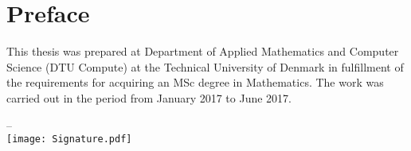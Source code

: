 \chapter{Preface}
This thesis was prepared at Department of Applied Mathematics and Computer Science (DTU Compute) at the Technical University of Denmark in fulfillment of the requirements for acquiring an MSc degree in Mathematics. The work was carried out in the period from January 2017 to June 2017.

\vfill

{
\centering
    \thesislocation{} – \thesisdeadline{}\\[1cm]
    \hspace{3cm}\texttt{[image: Signature.pdf]}\\[1cm]
\begin{flushright}
    \thesisauthor{}
\end{flushright}
}
